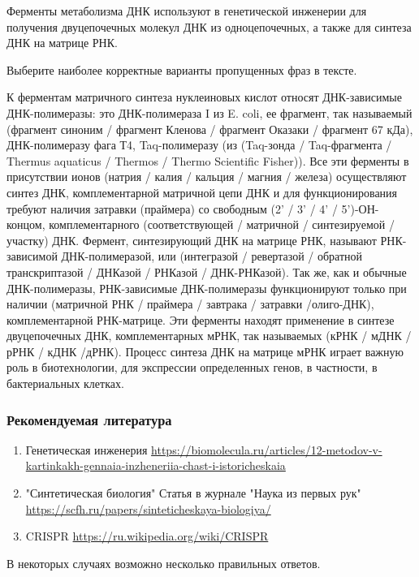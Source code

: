 
Ферменты метаболизма ДНК используют в генетической инженерии для получения двуцепочечных молекул ДНК из одноцепочечных, а также для синтеза ДНК на матрице РНК.

Выберите наиболее корректные варианты пропущенных фраз в тексте.

К ферментам матричного синтеза нуклеиновых кислот относят ДНК-зависимые ДНК-полимеразы: это ДНК-полимераза I из E. coli, ее фрагмент, так называемый 
(фрагмент синоним / фрагмент Кленова / фрагмент Оказаки / фрагмент 67 кДа), ДНК-полимеразу фага Т4, Taq-полимеразу (из 
(Taq-зонда / Taq-фрагмента / Thermus aquaticus / Thermos / Thermo Scientific Fisher)). Все эти ферменты в присутствии ионов 
(натрия / калия / кальция / магния / железа) осуществляют синтез ДНК, комплементарной матричной цепи ДНК и для функционирования требуют наличия затравки (праймера) со свободным 
(2' / 3' / 4' / 5')-ОН-концом, комплементарного (соответствующей / матричной / синтезируемой / участку) ДНК. Фермент, синтезирующий ДНК на матрице РНК, называют РНК-зависимой ДНК-полимеразой, или 
(интегразой / ревертазой / обратной транскриптазой / ДНКазой / РНКазой / ДНК-РНКазой). Так же, как и обычные ДНК-полимеразы, РНК-зависимые ДНК-полимеразы функционируют только при наличии 
(матричной РНК / праймера / завтрака / затравки /олиго-ДНК), комплементарной РНК-матрице. Эти ферменты находят применение в синтезе двуцепочечных ДНК, комплементарных мРНК, так называемых 
(кРНК / мДНК / рРНК / кДНК /дРНК). Процесс синтеза ДНК на матрице мРНК играет важную роль в биотехнологии, для экспрессии определенных генов, в частности, в бактериальных клетках. 

\subsubsection*{Рекомендуемая литература}

\begin{enumerate}
    \item Генетическая инженерия \url{https://biomolecula.ru/articles/12-metodov-v-kartinkakh-gennaia-inzheneriia-chast-i-istoricheskaia}
    \item "Синтетическая биология" Статья в журнале "Наука из первых рук" \url{https://scfh.ru/papers/sinteticheskaya-biologiya/}
    \item CRISPR \url{https://ru.wikipedia.org/wiki/CRISPR}
\end{enumerate}

\explanationSection

В некоторых случаях возможно несколько правильных ответов.

